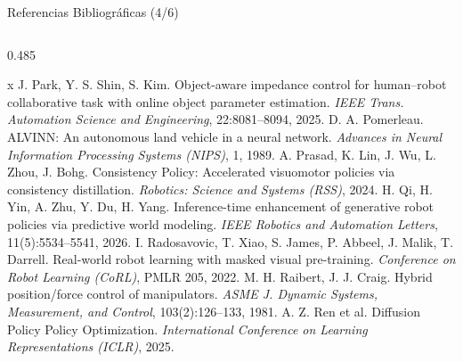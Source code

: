 \documentclass[aspectratio=169,10pt,xcolor={dvipsnames,table}]{beamer}
\begin{document}
\begin{frame}{Referencias Bibliográficas (4/6)}
\begin{columns}[T, onlytextwidth]
\begin{column}{0.485\textwidth}
\begin{thebibliography}{x}
         J. Park, Y. S. Shin, S. Kim. \newblock Object-aware impedance control for human--robot collaborative task with online object parameter estimation. \newblock \emph{IEEE Trans. Automation Science and Engineering}, 22:8081--8094, 2025.
         D. A. Pomerleau. \newblock ALVINN: An autonomous land vehicle in a neural network. \newblock \emph{Advances in Neural Information Processing Systems (NIPS)}, 1, 1989.
         A. Prasad, K. Lin, J. Wu, L. Zhou, J. Bohg. \newblock Consistency Policy: Accelerated visuomotor policies via consistency distillation. \newblock \emph{Robotics: Science and Systems (RSS)}, 2024.
         H. Qi, H. Yin, A. Zhu, Y. Du, H. Yang. \newblock Inference-time enhancement of generative robot policies via predictive world modeling. \newblock \emph{IEEE Robotics and Automation Letters}, 11(5):5534--5541, 2026.
         I. Radosavovic, T. Xiao, S. James, P. Abbeel, J. Malik, T. Darrell. \newblock Real-world robot learning with masked visual pre-training. \newblock \emph{Conference on Robot Learning (CoRL)}, PMLR 205, 2022.
         M. H. Raibert, J. J. Craig. \newblock Hybrid position/force control of manipulators. \newblock \emph{ASME J. Dynamic Systems, Measurement, and Control}, 103(2):126--133, 1981.
         A. Z. Ren et al. \newblock Diffusion Policy Policy Optimization. \newblock \emph{International Conference on Learning Representations (ICLR)}, 2025.
      \end{thebibliography}
    \end{column}
  \end{columns}
\end{frame}
\end{document}
